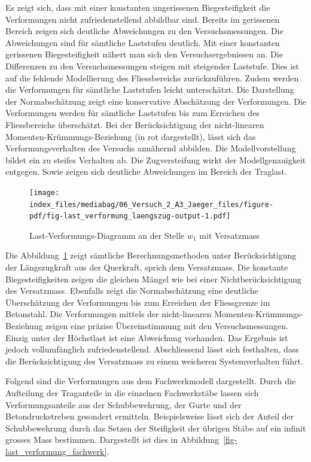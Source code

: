 \documentclass[
  12pt,
  letterpaper,
  egregdoesnotlikesansseriftitles]{scrreprt}
\begin{document}
Es zeigt sich, dass mit einer konstanten ungerissenen Biegesteifigkeit
die Verformungen nicht zufriedenstellend abbildbar sind. Bereits im
gerissenen Bereich zeigen sich deutliche Abweichungen zu den
Versuchsmessungen. Die Abweichungen sind für sämtliche Laststufen
deutlich. Mit einer konstanten gerissenen Biegesteifigkeit nähert man
sich den Versuchsergebnissen an. Die Differenzen zu den
Versuchsmessungen steigen mit steigender Laststufe. Dies ist auf die
fehlende Modellierung des Fliessbereichs zurückzuführen. Zudem werden
die Verformungen für sämtliche Laststufen leicht unterschätzt. Die
Darstellung der Normabschätzung zeigt eine konservative Abschätzung der
Verformungen. Die Verformungen werden für sämtliche Laststufen bis zum
Erreichen des Fliessbereichs überschätzt. Bei der Berücksichtigung der
nicht-linearen Momenten-Krümmungs-Beziehung (in rot dargestellt), lässt
sich das Verformungsverhalten des Versuchs annähernd abbilden. Die
Modellvorstellung bildet ein zu steifes Verhalten ab. Die Zugversteifung
wirkt der Modellgenauigkeit entgegen. Sowie zeigen sich deutliche
Abweichungen im Bereich der Traglast.

\begin{figure}[H]

{\centering \texttt{[image: index\_files/mediabag/06\_Versuch\_2\_A3\_Jaeger\_files/figure-pdf/fig-last\_verformung\_laengszug-output-1.pdf]}

}

\caption{\label{fig-last_verformung_laengszug}Last-Verformungs-Diagramm
an der Stelle \(w_1\) mit Versatzmass}

\end{figure}

Die Abbildung~\ref{fig-last_verformung_laengszug} zeigt sämtliche
Berechnungsmethoden unter Berücksichtigung der Längszugkraft aus der
Querkraft, sprich dem Versatzmass. Die konstante Biegesteifigkeiten
zeigen die gleichen Mängel wie bei einer Nichtberücksichtigung des
Versatzmass. Ebenfalls zeigt die Normabschätzung eine deutliche
Überschätzung der Verformungen bis zum Erreichen der Fliessgrenze im
Betonstahl. Die Verformungen mittels der nicht-linearen
Momenten-Krümmungs-Beziehung zeigen eine präzise Übereinstimmung mit den
Versuchsmessungen. Einzig unter der Höchstlast ist eine Abweichung
vorhanden. Das Ergebnis ist jedoch vollumfänglich zufriedenstellend.
Abschliessend lässt sich festhalten, dass die Berücksichtigung des
Versatzmass zu einem weicheren Systemverhalten führt.

Folgend sind die Verformungen aus dem Fachwerkmodell dargestellt. Durch
die Aufteilung der Traganteile in die einzelnen Fachwerkstäbe lassen
sich Verformungsanteile aus der Schubbewehrung, der Gurte und der
Betondruckstreben gesondert ermitteln. Beispielsweise lässt sich der
Anteil der Schubbewehrung durch das Setzen der Steifigkeit der übrigen
Stäbe auf ein infinit grosses Mass bestimmen. Dargestellt ist dies in
Abbildung~\ref{fig-last_verformung_fachwerk}.
\end{document}
